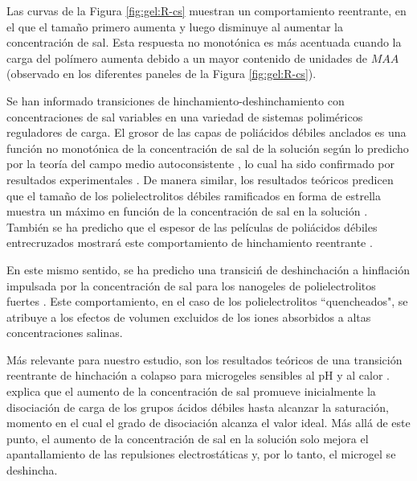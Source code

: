 Las curvas de la Figura \ref{fig:gel:R-cs} muestran un comportamiento reentrante, en el que el tama\~no primero aumenta y luego disminuye al aumentar la concentraci\'on de sal.
Esta respuesta no monot\'onica es m\'as acentuada cuando la carga del pol\'imero aumenta debido a un mayor contenido de unidades de $MAA$ (observado en los diferentes paneles de la Figura \ref{fig:gel:R-cs}).

Se han informado transiciones de hinchamiento-deshinchamiento con concentraciones de sal variables en una variedad de sistemas polim\'ericos reguladores de carga.
El grosor de las capas de poli\'acidos d\'ebiles anclados es una funci\'on no monot\'onica de la concentraci\'on de sal de la soluci\'on seg\'un lo predicho por la teor\'ia del campo medio autoconsistente \cite{Israels1994, Lyatskaya1995, Zhulina1995, Gong2007}, lo cual ha sido confirmado por resultados experimentales \cite{Wu2007}.
De manera similar, los resultados te\'oricos predicen que el tama\~no de los polielectrolitos d\'ebiles ramificados en forma de estrella muestra un m\'aximo en funci\'on de la concentraci\'on de sal en la soluci\'on \cite{Borisov1998, KleinWolterink2002}.
Tambi\'en se ha predicho que el espesor de las pel\'iculas de poli\'acidos d\'ebiles entrecruzados mostrar\'a este comportamiento de hinchamiento reentrante \cite{Longo2014JCP}.






En este mismo sentido, se ha predicho una transici\'n de deshinchaci\'on a hinflaci\'on impulsada por la concentraci\'on de sal para los nanogeles de polielectrolitos fuertes \cite{jha2012understanding}. Este comportamiento, en el caso de los polielectrolitos ``quencheados", se atribuye a los efectos de volumen excluidos de los iones absorbidos a altas concentraciones salinas.

M\'as relevante para nuestro estudio, son los resultados te\'oricos de una transici\'on reentrante de hinchaci\'on a colapso para microgeles sensibles al pH y al calor \cite{polotsky2013collapse}. \citet{polotsky2013collapse} explica que el aumento de la concentraci\'on de sal promueve inicialmente la disociaci\'on de carga de los grupos \'acidos d\'ebiles hasta alcanzar la saturaci\'on, momento en el cual el grado de disociaci\'on alcanza el valor ideal. M\'as all\'a de este punto, el aumento de la concentraci\'on de sal en la soluci\'on solo mejora el apantallamiento de las repulsiones electrost\'aticas y, por lo tanto, el microgel se deshincha.

